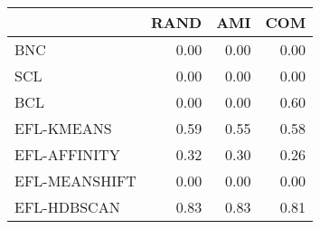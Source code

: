 \begin{tabular}{lrrr}
\toprule
 & RAND & AMI & COM \\
\midrule
BNC & 0.00 & 0.00 & 0.00 \\
SCL & 0.00 & 0.00 & 0.00 \\
BCL & 0.00 & 0.00 & 0.60 \\
EFL-KMEANS & 0.59 & 0.55 & 0.58 \\
EFL-AFFINITY & 0.32 & 0.30 & 0.26 \\
EFL-MEANSHIFT & 0.00 & 0.00 & 0.00 \\
EFL-HDBSCAN & 0.83 & 0.83 & 0.81 \\
\bottomrule
\end{tabular}
